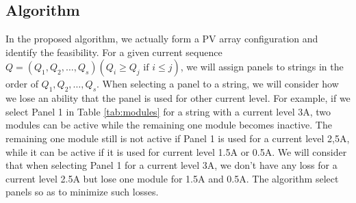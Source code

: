 \documentclass[conference]{IEEEtran}
\begin{document}

\subsection{Algorithm}

In the proposed algorithm, we actually form a PV array configuration and identify the feasibility. For a given current sequence $Q = (Q_{1},Q_{2},\ldots ,Q_{s}) (Q_{i} \geq Q_{j} \mbox{\ if\ } i \leq j)$, we will assign panels to strings in the order of $Q_{1},Q_{2},\ldots ,Q_{s}$. When selecting a panel to a string, we will consider how we lose an ability that the panel is used for other current level. For example, if we select Panel 1 in Table \ref{tab:modules} for a string with a current level 3A, two modules can be active while the remaining one module becomes inactive. 
The remaining one module still is not active if Panel 1 is used for a current level 2,5A, while it can be active if it is used for current level 1.5A or 0.5A. We will consider that when selecting Panel 1 for a current level 3A, we don't have any loss for a current level 2.5A but lose one module for 1.5A and 0.5A. The algorithm select panels so as to minimize such losses. 
\end{document}

